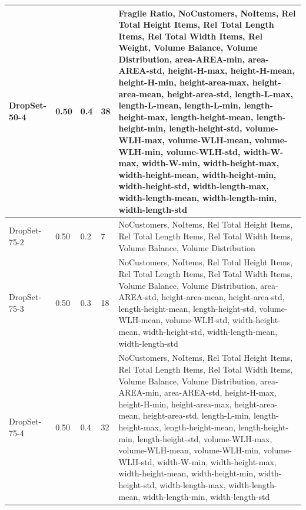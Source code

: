\begin{table}[ht]
{\begin{tabular}{@{}P{0.04\paperheight}P{0.04\paperheight}P{0.07\paperheight}P{0.05\paperheight}P{0.46\paperheight}@{}}
            \midrule
            DropSet-50-4 & 0.50        & 0.4                             & 38              & Fragile Ratio, NoCustomers, NoItems, Rel Total Height Items, Rel Total Length Items, Rel Total Width Items, Rel Weight, Volume Balance, Volume Distribution, area-AREA-min, area-AREA-std, height-H-max, height-H-mean, height-H-min, height-area-max, height-area-mean, height-area-std, length-L-max, length-L-mean, length-L-min, length-height-max, length-height-mean, length-height-min, length-height-std, volume-WLH-max, volume-WLH-mean, volume-WLH-min, volume-WLH-std, width-W-max, width-W-min, width-height-max, width-height-mean, width-height-min, width-height-std, width-length-max, width-length-mean, width-length-min, width-length-std \\
            \midrule
            DropSet-75-2 & 0.50        & 0.2                             & 7               & NoCustomers, NoItems, Rel Total Height Items, Rel Total Length Items, Rel Total Width Items, Volume Balance, Volume Distribution                                                                                                                                                                                                                                                                                                                                                                                                                                                                                                                              \\
            \midrule
            DropSet-75-3 & 0.50        & 0.3                             & 18              & NoCustomers, NoItems, Rel Total Height Items, Rel Total Length Items, Rel Total Width Items, Volume Balance, Volume Distribution, area-AREA-std, height-area-mean, height-area-std, length-height-mean, length-height-std, volume-WLH-mean, volume-WLH-std, width-height-mean, width-height-std, width-length-mean, width-length-std                                                                                                                                                                                                                                                                                                                          \\
            \midrule
            DropSet-75-4 & 0.50        & 0.4                             & 32              & NoCustomers, NoItems, Rel Total Height Items, Rel Total Length Items, Rel Total Width Items, Volume Balance, Volume Distribution, area-AREA-min, area-AREA-std, height-H-max, height-H-min, height-area-max, height-area-mean, height-area-std, length-L-min, length-height-max, length-height-mean, length-height-min, length-height-std, volume-WLH-max, volume-WLH-mean, volume-WLH-min, volume-WLH-std, width-W-min, width-height-max, width-height-mean, width-height-min, width-height-std, width-length-max, width-length-mean, width-length-min, width-length-std                                                                                     \\


\end{tabular}}
\end{table}
